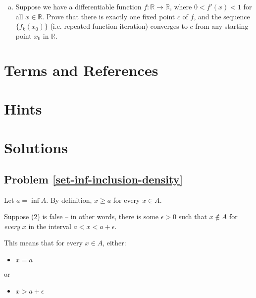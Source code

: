 \begin{problem}
\qquad
\begin{enumerate}[(a)]
\item Suppose we have a differentiable function $f: \mathbb{R} \rightarrow \mathbb{R}$, where $0 < f'(x) < 1$ for all $x \in \mathbb{R}$. Prove that there is exactly one fixed point $c$ of $f$, and the sequence $\{f_k(x_0)\}$ (i.e. repeated function iteration) converges to $c$ from any starting point $x_0$ in $\mathbb{R}$. 

\end{enumerate}
\end{problem}


\newpage
\section{Terms and References}

\section{Hints}

\newpage
\section{Solutions}

\subsection{Problem \ref{set-inf-inclusion-density}}


Let $a = \inf A$. By definition, $x \geq a$ for every $x \in A$.

Suppose (2) is false -- in other words, there is some $\epsilon > 0$ such that $x \notin A$ for \textit{every} $x$ in the interval $a < x < a + \epsilon$. 

This means that for every $x \in A$, either:
\begin{itemize}
\item $x = a$
\end{itemize}
or
\begin{itemize}
\item $x > a + \epsilon$
\end{itemize}

